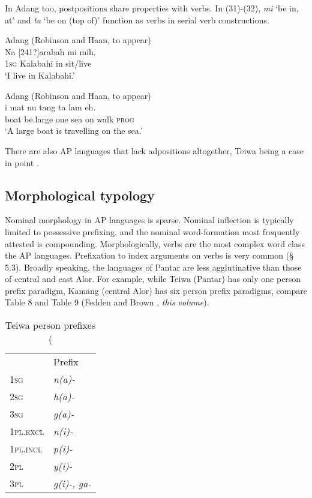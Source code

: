 In Adang too, postpositions share properties with verbs. In (31)-(32), \textit{mi} `be in, at' and \textit{ta} `be on (top of)' function as verbs in serial verb constructions.



\ea%
\label{ex:31}
Adang (Robinson and Haan, to appear)    \\
\gll Na  [241?]arabah  mi  mih. \\
\textsc{1sg} Kalabahi  in   sit/live      \\
\glt `I live in Kalabahi.'
\z


\ea%
\label{ex:32}
 Adang (Robinson and Haan, to appear)   \\
\gll
{\textepsilon}i  mat{\textepsilon}  nu  tang  ta  lam{\textepsilon} eh.  \\
 boat  be.large  one  sea  on  walk  \textsc{prog}   \\
\glt `A large boat is travelling on the sea.'
\z


There are also AP languages that lack adpositions altogether, Teiwa being a case in point \citep{Klamer2010a}.

\subsection{Morphological typology}
Nominal morphology in AP languages is sparse. Nominal inflection is typically limited to possessive prefixing, and the nominal word-formation most frequently attested is compounding. Morphologically, verbs are the most complex word class the AP languages. Prefixation to index arguments on verbs is very common ({\S} 5.3). Broadly speaking, the languages of Pantar are less agglutinative than those of central and east Alor. For example, while Teiwa (Pantar) has only one person prefix paradigm, Kamang (central Alor) has six person prefix paradigms, compare Table 8 and Table 9 (Fedden and Brown , \textit{this volume}).


\begin{table}\centering


\begin{tabular}{ll} & Prefix\\
{\scshape 1sg} & {\itshape n(a)-}\\
{\scshape 2sg} & {\itshape h(a)-}\\
{\scshape 3sg} & {\itshape g(a)-}\\
{\scshape 1pl.excl} & {\itshape n(i)-}\\
{\scshape 1pl.incl} & {\itshape p(i)-}\\
{\scshape 2pl} & {\itshape y(i)-}\\
{\scshape 3pl} & {\itshape g(i)-, ga-}\\
\end{tabular}

\caption{Teiwa person prefixes (\citep[77,78]{Klamer2010a}}
\end{table}




